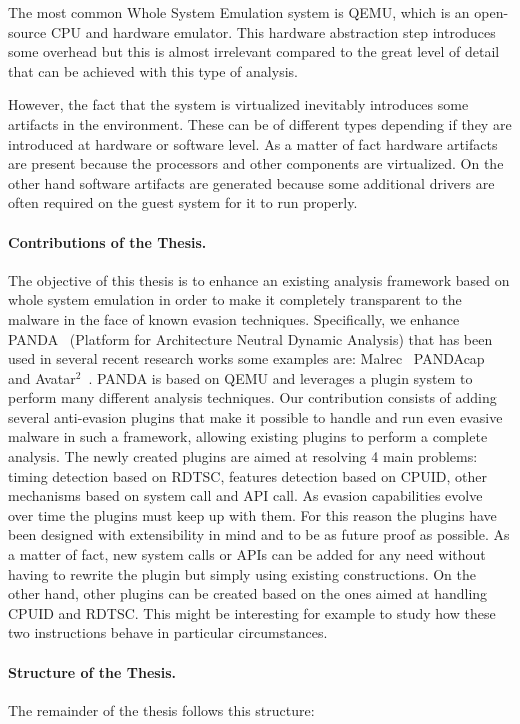 The most common Whole System Emulation system is QEMU, which is an open-source CPU and hardware emulator. This hardware abstraction step introduces some overhead but this is almost irrelevant compared to the great level of detail that can be achieved with this type of analysis. 

However, the fact that the system is virtualized inevitably introduces some artifacts in the environment. These can be of different types depending if they are introduced at hardware or software level. As a matter of fact hardware artifacts are present because the processors and other components are virtualized. On the other hand software artifacts are generated because some additional drivers are often required on the guest system for it to run properly. 

\paragraph{Contributions of the Thesis.}
The objective of this thesis is to enhance an existing analysis framework based on whole system emulation in order to make it completely transparent to the malware in the face of known evasion techniques. Specifically, we enhance PANDA~\cite{panda} (Platform for Architecture Neutral Dynamic Analysis) that has been used in several recent research works some examples are: Malrec~\cite{malrec} PANDAcap~\cite{pandacap} and Avatar$^2$~\cite{avatar2}. PANDA is based on QEMU and leverages a plugin system to perform many different analysis techniques. Our contribution consists of adding several anti-evasion plugins that make it possible to handle and run even evasive malware in such a framework, allowing existing plugins to perform a complete analysis. The newly created plugins are aimed at resolving 4 main problems: timing detection based on RDTSC, features detection based on CPUID, other mechanisms based on system call and API call. As evasion capabilities evolve over time the plugins must keep up with them. For this reason the plugins have been designed with extensibility in mind and to be as future proof as possible. As a matter of fact, new system calls or APIs can be added for any need without having to rewrite the plugin but simply using existing constructions. On the other hand, other plugins can be created based on the ones aimed at handling CPUID and RDTSC. This might be interesting for example to study how these two instructions behave in particular circumstances.


\medskip
\paragraph{Structure of the Thesis.} The remainder of the thesis follows this structure:

